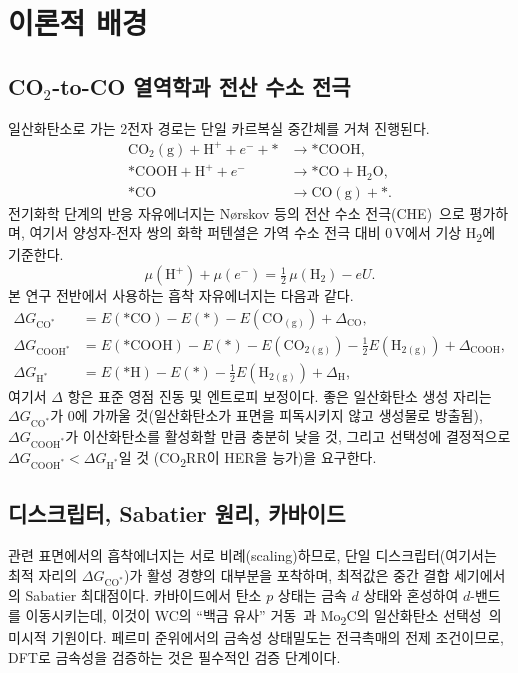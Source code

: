 \documentclass[11pt,a4paper]{report}
\providecommand{\SI}[2]{#1\,#2}
\newcommand{\dGCO}{\Delta G_{\mathrm{CO^*}}}
\newcommand{\dGH}{\Delta G_{\mathrm{H^*}}}
\newcommand{\dGCOOH}{\Delta G_{\mathrm{COOH^*}}}
\begin{document}
\chapter{이론적 배경}
\label{ch:theory}

\section{CO\texorpdfstring{$_2$}{2}-to-CO 열역학과 전산 수소 전극}
일산화탄소로 가는 2전자 경로는 단일 카르복실 중간체를 거쳐 진행된다.
\begin{align}
\mathrm{CO_2(g)} + \mathrm{H^+} + e^- + {*} &\rightarrow \mathrm{*COOH},\\
\mathrm{*COOH} + \mathrm{H^+} + e^- &\rightarrow \mathrm{*CO} + \mathrm{H_2O},\\
\mathrm{*CO} &\rightarrow \mathrm{CO(g)} + {*}.
\end{align}
전기화학 단계의 반응 자유에너지는 N\o{}rskov 등의 전산 수소 전극(CHE)~\cite{norskov2004}으로
평가하며, 여기서 양성자-전자 쌍의 화학 퍼텐셜은 가역 수소 전극 대비 \SI{0}{V}에서 기상
H\textsubscript{2}에 기준한다.
\begin{equation}
\mu(\mathrm{H^+}) + \mu(e^-) = \tfrac{1}{2}\,\mu(\mathrm{H_2}) - eU .
\end{equation}
본 연구 전반에서 사용하는 흡착 자유에너지는 다음과 같다.
\begin{align}
\dGCO   &= E(\mathrm{*CO})   - E(*) - E(\mathrm{CO_{(g)}}) + \Delta_{\mathrm{CO}},\\
\dGCOOH &= E(\mathrm{*COOH}) - E(*) - E(\mathrm{CO_{2(g)}}) - \tfrac12 E(\mathrm{H_{2(g)}}) + \Delta_{\mathrm{COOH}},\\
\dGH    &= E(\mathrm{*H})    - E(*) - \tfrac12 E(\mathrm{H_{2(g)}}) + \Delta_{\mathrm{H}},
\end{align}
여기서 $\Delta$ 항은 표준 영점 진동 및 엔트로피 보정이다. 좋은 일산화탄소 생성 자리는
$\dGCO$가 0에 가까울 것(일산화탄소가 표면을 피독시키지 않고 생성물로 방출됨), $\dGCOOH$가
이산화탄소를 활성화할 만큼 충분히 낮을 것, 그리고 선택성에 결정적으로 $\dGCOOH < \dGH$일 것
(CO\textsubscript{2}RR이 HER을 능가)을 요구한다.

\section{디스크립터, Sabatier 원리, 카바이드}
관련 표면에서의 흡착에너지는 서로 비례(scaling)하므로, 단일 디스크립터(여기서는 최적 자리의
$\dGCO$)가 활성 경향의 대부분을 포착하며, 최적값은 중간 결합 세기에서의 Sabatier 최대점이다.
카바이드에서 탄소 $p$ 상태는 금속 $d$ 상태와 혼성하여 $d$-밴드를 이동시키는데, 이것이 WC의
``백금 유사'' 거동~\cite{levy1973}과 Mo\textsubscript{2}C의 일산화탄소 선택성~\cite{porosoff2014}의
미시적 기원이다. 페르미 준위에서의 금속성 상태밀도는 전극촉매의 전제 조건이므로, DFT로 금속성을
검증하는 것은 필수적인 검증 단계이다.
\end{document}

